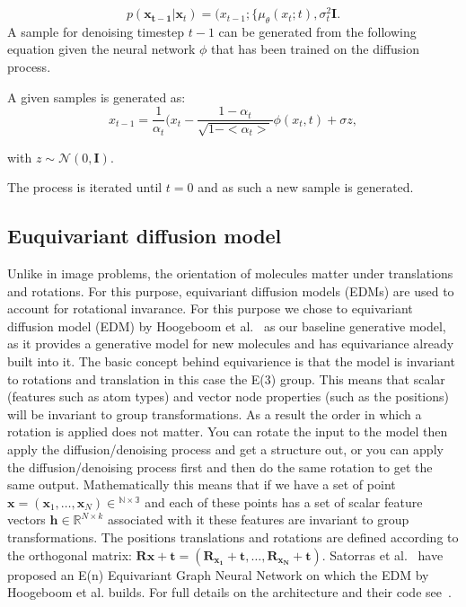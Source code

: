 \documentclass[journal=jacsat,manuscript=article]{achemso}
\begin{document}
\begin{equation}
p(\mathbf{x_{t-1}}|\mathbf{x}_t)=\mathcal(x_{t-1}; \{\mu_{\theta}(x_t;t), \sigma_t^2\mathbf{I}.
\end{equation}
A sample for denoising timestep $t-1$ can be generated from the following equation given the neural network $\phi$ that has been trained on the diffusion process. 

A given samples is generated as:
\begin{equation}
 x_{t-1} = \frac{1}{\alpha_t}(x_t-\frac{1-\alpha_t}{\sqrt{1-<\alpha_t>}}\phi(x_t,t) +\sigma z,   
\end{equation}

with $z\sim\mathcal{N}(0,\mathbf{I})$.

The process is iterated until $t=0$ and as such a new sample is generated. 

\subsection*{Euquivariant diffusion model}
Unlike in image problems, the orientation of molecules matter under translations and rotations. For this purpose, equivariant diffusion models (EDMs) are used to account for rotational invarance. For this purpose we chose to equivariant diffusion model (EDM) by Hoogeboom et al.~\cite{hoogeboom2022equivariant} as our baseline generative model, as it provides a generative model for new molecules and has equivariance already built into it.  The basic concept behind equivarience is that the model is invariant to rotations and translation in this case the E(3) group. This means that scalar (features such as atom types) and vector node properties (such as the positions) will be invariant to group transformations. As a result the order in which a rotation is applied does not matter. You can rotate the input to the model then apply the diffusion/denoising process and get a structure out, or you can apply the diffusion/denoising process first and then do the same rotation to get the same output. 
Mathematically this means that if we have a set of point $\mathbf{x} = (\mathbf{x}_1,\ldots,\mathbf{x}_N) \in \mathbb{^{N\times 3}}$ and each of these points has a set of scalar feature vectors $\mathbf{h}\in \mathbb{R}^{N\times k}$ associated with it these features are invariant to group transformations. The positions translations and rotations are defined according to the orthogonal matrix: $\mathbf{Rx + t} = (\mathbf{R_{x_1}+t},\ldots, \mathbf{R_{x_N}+t})$. Satorras et al.~\cite{satorras2022equivariant} have proposed an E(n) Equivariant Graph Neural Network on which the EDM by Hoogeboom et al. builds. For full details on the architecture and their code see~\cite{hoogeboom2022equivariant}. 
\end{document}
